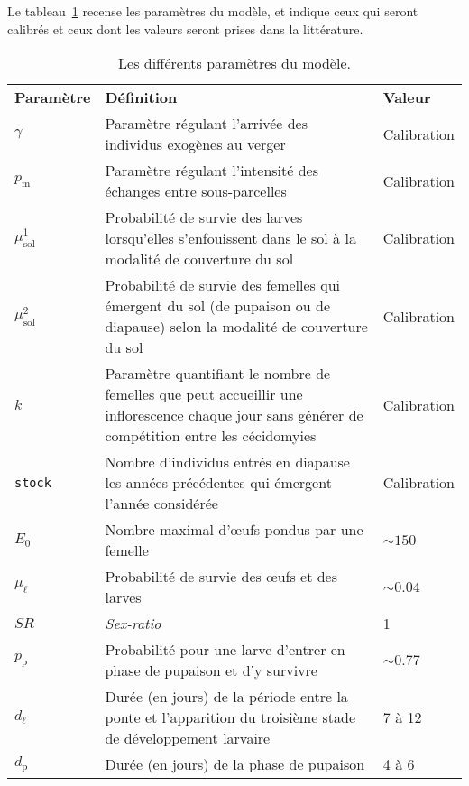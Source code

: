Le tableau~\ref{tab:param} recense les paramètres du modèle, et indique ceux qui seront calibrés et ceux dont les valeurs seront prises dans la littérature.


    \clearpage%

    \begin{landscape}%
\begin{table}
\caption{Les différents paramètres du modèle.}
\label{tab:param}
\centering
{
\begin{tabular}{p{2cm}p{11.9cm}p{5cm}}
\textbf{Paramètre} & \textbf{Définition} & \textbf{Valeur}\\
$\gamma$ & Paramètre régulant l'arrivée des individus exogènes au verger & Calibration\\
$p_{\text{m}}$ & Paramètre régulant l'intensité des échanges entre sous-parcelles & Calibration\\
$\mu_{\text{sol}}^1$ & Probabilité de survie des larves lorsqu'elles s'enfouissent dans le sol à la modalité de couverture du sol & Calibration\\
$\mu_{\text{sol}}^2$ & Probabilité de survie des femelles qui émergent du sol (de pupaison ou de diapause) selon la modalité de couverture du sol & Calibration\\
$k$ & Paramètre quantifiant le nombre de femelles que peut accueillir une inflorescence chaque jour sans générer de compétition entre les cécidomyies & Calibration\\
\texttt{stock} & Nombre d'individus entrés en diapause les années précédentes qui émergent l'année considérée & Calibration  \\
$E_0$ & Nombre maximal d'œufs pondus par une femelle & $\sim\!150$ \citep{paul}\\
$\mu_{\ell}$ & Probabilité de survie des œufs et des larves & $\sim\!0.04$ \citep{paul}\\
$\mathit{SR}$ & \textit{Sex-ratio} & 1 \citep{paul}\\
$p_{\text{p}}$ & Probabilité pour une larve d'entrer en phase de pupaison et d'y survivre & $\sim\! 0.77$ \citep{pauldiap}\\
$d_{\ell}$ & Durée (en jours) de la période entre la ponte et l'apparition du troisième stade de développement larvaire & 7 à 12 \citep{paul} \\
$d_{\text{p}}$ & Durée (en jours) de la phase de pupaison & 4 à 6 \citep{paul}
\end{tabular}
}
\end{table}
    \end{landscape}

